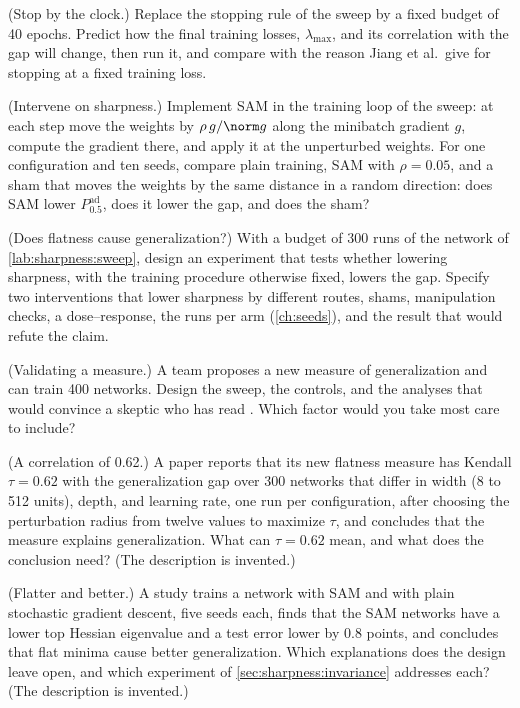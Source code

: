 \begin{refsection}
\begin{exercises}
\item \labwork (Stop by the clock.) Replace the stopping rule of the sweep by a fixed budget of 40 epochs. Predict how the final training losses, $\lambda_{\max}$, and its correlation with the gap will change, then run it, and compare with the reason Jiang et al.\ give for stopping at a fixed training loss.\label{ex:sharpness:clock}

\item \labwork (Intervene on sharpness.) Implement SAM \parencite{ForetEtAl2021} in the training loop of the sweep: at each step move the weights by $\rho\,g/\norm g$ along the minibatch gradient $g$, compute the gradient there, and apply it at the unperturbed weights. For one configuration and ten seeds, compare plain training, SAM with $\rho=0.05$, and a sham that moves the weights by the same distance in a random direction: does SAM lower $P^{\mathrm{ad}}_{0.5}$, does it lower the gap, and does the sham?\label{ex:sharpness:sam}

\item \design (Does flatness cause generalization?) With a budget of 300 runs of the network of \cref{lab:sharpness:sweep}, design an experiment that tests whether lowering sharpness, with the training procedure otherwise fixed, lowers the gap. Specify two interventions that lower sharpness by different routes, shams, manipulation checks, a dose--response, the runs per arm (\cref{ch:seeds}), and the result that would refute the claim.\label{ex:sharpness:causal}

\item \design (Validating a measure.) A team proposes a new measure of generalization and can train 400 networks. Design the sweep, the controls, and the analyses that would convince a skeptic who has read \textcite{DziugaiteEtAl2020}. Which factor would you take most care to include?\label{ex:sharpness:validate}

\item \critique (A correlation of 0.62.) A paper reports that its new flatness measure has Kendall $\tau=0.62$ with the generalization gap over 300 networks that differ in width (8 to 512 units), depth, and learning rate, one run per configuration, after choosing the perturbation radius from twelve values to maximize $\tau$, and concludes that the measure explains generalization. What can $\tau=0.62$ mean, and what does the conclusion need? (The description is invented.)\label{ex:sharpness:critique1}

\item \critique (Flatter and better.) A study trains a network with SAM and with plain stochastic gradient descent, five seeds each, finds that the SAM networks have a lower top Hessian eigenvalue and a test error lower by 0.8 points, and concludes that flat minima cause better generalization. Which explanations does the design leave open, and which experiment of \cref{sec:sharpness:invariance} addresses each? (The description is invented.)\label{ex:sharpness:critique2}


\end{exercises}
\end{refsection}
